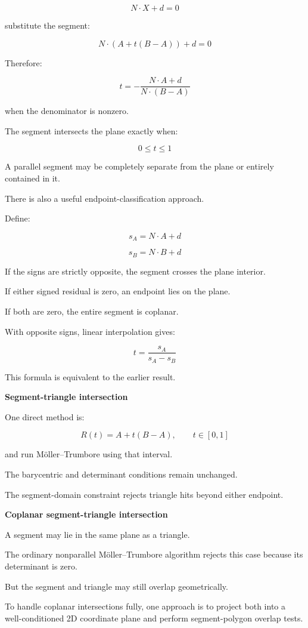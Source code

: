 \[
N\cdot X+d=0
\]

substitute the segment:

\[
N\cdot(A+t(B-A))+d=0
\]

Therefore:

\[
\boxed{ t= -\frac{N\cdot A+d}{N\cdot(B-A)} }
\]

when the denominator is nonzero.

The segment intersects the plane exactly when:

\[
0\le t\le1
\]

A parallel segment may be completely separate from the plane or entirely contained in it.

There is also a useful endpoint-classification approach.

Define:

\[
s_A=N\cdot A+d
\]

\[
s_B=N\cdot B+d
\]

If the signs are strictly opposite, the segment crosses the plane interior.

If either signed residual is zero, an endpoint lies on the plane.

If both are zero, the entire segment is coplanar.

With opposite signs, linear interpolation gives:

\[
\boxed{ t=\frac{s_A}{s_A-s_B} }
\]

This formula is equivalent to the earlier result.

\textbf{Segment-triangle intersection}

One direct method is:

\[
R(t)=A+t(B-A),\qquad t\in[0,1]
\]

and run Möller--Trumbore using that interval.

The barycentric and determinant conditions remain unchanged.

The segment-domain constraint rejects triangle hits beyond either endpoint.

\textbf{Coplanar segment-triangle intersection}

A segment may lie in the same plane as a triangle.

The ordinary nonparallel Möller--Trumbore algorithm rejects this case because its determinant is zero.

But the segment and triangle may still overlap geometrically.

To handle coplanar intersections fully, one approach is to project both into a well-conditioned 2D coordinate plane and perform segment-polygon overlap tests.

